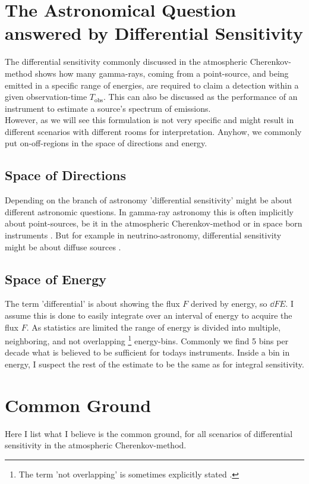 \documentclass{article}%
\begin{document}
\section{The Astronomical Question answered by Differential Sensitivity}
\label{SecAstronomicalQuastion}
The differential sensitivity commonly discussed in the atmospheric Cherenkov-method shows how many gamma-rays, coming from a point-source, and being emitted in a specific range of energies, are required to claim a detection within a given observation-time $T_\text{obs}$.
%
This can also be discussed as the performance of an instrument to estimate a source's spectrum of emissions.\\
%
However, as we will see this formulation is not very specific and might result in different scenarios with different rooms for interpretation.
%
Anyhow, we commonly put on-off-regions in the space of directions and energy.
%
\subsection*{Space of Directions}
%
Depending on the branch of astronomy 'differential sensitivity' might be about different astronomic questions.
%
In gamma-ray astronomy this is often implicitly about point-sources, be it in the atmospheric Cherenkov-method \cite{cta2018baseline,cortina2016machete} or in space born instruments \cite{wood2016fermiperformance}.
%
But for example in neutrino-astronomy, differential sensitivity might be about diffuse sources \cite{marinelli2021km3netarca}.
%
\subsection*{Space of Energy}
%
The term 'differential' is about showing the flux $F$ derived by energy, so $\dd{F}{E}$.
%
I assume this is done to easily integrate over an interval of energy to acquire the flux $F$.
%
As statistics are limited the range of energy is divided into multiple, neighboring, and not overlapping \footnote{The term 'not overlapping' is sometimes explicitly stated \cite{cta2018baseline}.} energy-bins.
%
Commonly we find 5 bins per decade what is believed to be sufficient for todays instruments.
%
Inside a bin in energy, I suspect the rest of the estimate to be the same as for integral sensitivity.
%
\section{Common Ground}
\label{SecCommonGround}
%
Here I list what I believe is the common ground, for all scenarios of differential sensitivity in the atmospheric Cherenkov-method.
%
\end{document}
